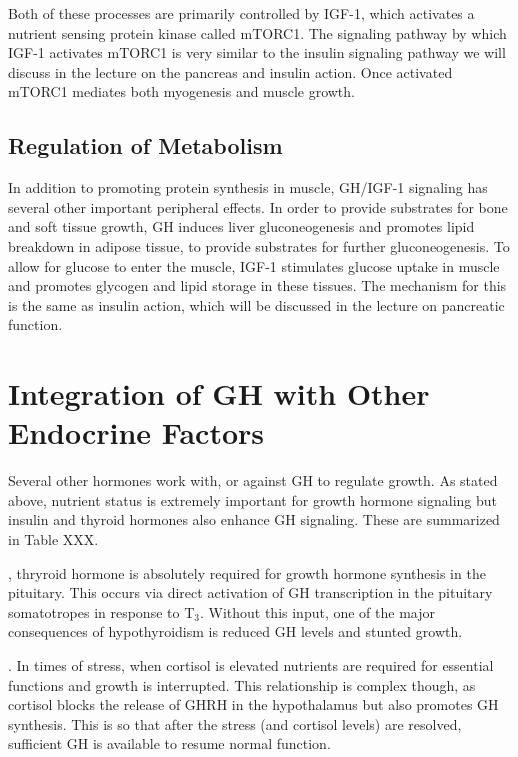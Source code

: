 \documentclass{tufte-handout}
\begin{document}
  Both of these processes are primarily controlled by IGF-1, which activates a nutrient sensing protein kinase called mTORC1.  The signaling pathway by which IGF-1 activates mTORC1 is very similar to the insulin signaling pathway we will discuss in the lecture on the pancreas and insulin action.  Once activated mTORC1 mediates both myogenesis and muscle growth.

\subsection{Regulation of Metabolism}

In addition to promoting protein synthesis in muscle, GH/IGF-1 signaling has several other important peripheral effects.  In order to provide substrates for bone and soft tissue growth, GH induces liver gluconeogenesis and promotes lipid breakdown in adipose tissue, to provide substrates for further gluconeogenesis.  To allow for glucose to enter the muscle, IGF-1 stimulates glucose uptake in muscle and promotes glycogen and lipid storage in these tissues.  The mechanism for this is the same as insulin action, which will be discussed in the lecture on pancreatic function.

\section{Integration of GH with Other Endocrine Factors}

Several other hormones work with, or against GH  to regulate growth.  As stated above, nutrient status is extremely important for growth hormone signaling but insulin and thyroid hormones also enhance GH signaling.  These are summarized in Table XXX.

, thryroid hormone is absolutely required for growth hormone synthesis in the pituitary.  This occurs via direct activation of GH transcription in the pituitary somatotropes in response to T$_3$.  Without this input, one of the major consequences of hypothyroidism is reduced GH levels and stunted growth.

.  In times of stress, when cortisol is elevated nutrients are required for essential functions and growth is interrupted.  This relationship is complex though, as cortisol blocks the release of GHRH in the hypothalamus but also promotes GH synthesis.  This is so that after the stress (and cortisol levels) are resolved, sufficient GH is available to resume normal function.
\end{document}
